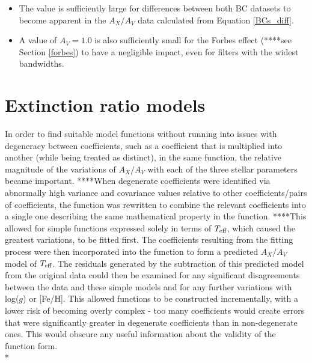 \documentclass[12pt, a4paper]{report}
\begin{document}
\begin{itemize}
\item The value is sufficiently large for differences between both BC datasets to become apparent in the $A_{X}/A_{V}$ data calculated from Equation \ref{BCs_diff}.
\item A value of $A_{V} = 1.0$ is also sufficiently small for the Forbes effect (****see Section \ref{forbes}) to have a negligible impact, even for filters with the widest bandwidths.
\end{itemize}

\section{Extinction ratio models} \label{ext_models}

In order to find suitable model functions without running into issues with degeneracy between coefficients, such as a coefficient that is multiplied into another (while being treated as distinct), in the same function, the relative magnitude of the variations of $A_{X}/A_{V}$ with each of the three stellar parameters became important. ****When degenerate coefficients were identified via abnormally high variance and covariance values relative to other coefficients/pairs of coefficients, the function was rewritten to combine the relevant coefficients into a single one describing the same mathematical property in the function. ****This allowed for simple functions expressed solely in terms of $T_{\textnormal{eff}}$, which caused the greatest variations, to be fitted first. The coefficients resulting from the fitting process were then incorporated into the function to form a predicted $A_{X}/A_{V}$ model of $T_{\textnormal{eff}}$. The residuals generated by the subtraction of this predicted model from the original data could then be examined for any significant disagreements between the data and these simple models and for any further variations with log($g$) or [Fe/H]. This allowed functions to be constructed incrementally, with a lower risk of becoming overly complex - too many coefficients would create errors that were significantly greater in degenerate coefficients than in non-degenerate ones. This would obscure any useful information about the validity of the function form. \\*
\end{document}
